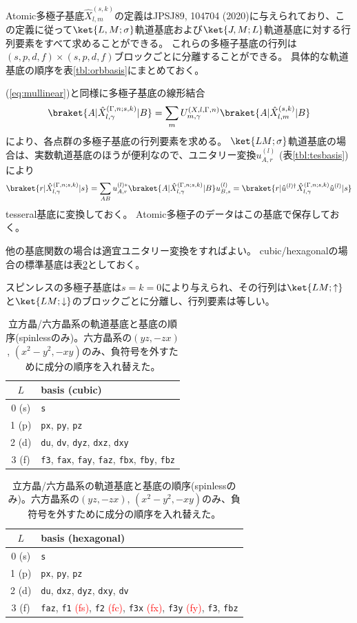 \documentclass[11pt]{easymemo}
\begin{document}
Atomic多極子基底$\hat{X}_{l,m}^{(s,k)}$の定義はJPSJ89, 104704 (2020)に与えられており、この定義に従って$\ket{L,M;\sigma}$軌道基底および$\ket{J,M;L}$軌道基底に対する行列要素をすべて求めることができる。
これらの多極子基底の行列は$(s,p,d,f)\times(s,p,d,f)$ブロックごとに分離することができる。
具体的な軌道基底の順序を表\ref{tbl:orbbasis}にまとめておく。

(\ref{eq:mullinear})と同様に多極子基底の線形結合
\begin{align}
\braket{A|\hat{X}_{l,\gamma}^{(\Gamma,n;s,k)}|B}=\sum_{m}U_{m,\gamma}^{(X,l,\Gamma,n)}\braket{A|\hat{X}_{l,m}^{(s,k)}|B}
\end{align}
により、各点群の多極子基底の行列要素を求める。
$\ket{LM;\sigma}$軌道基底の場合は、実数軌道基底のほうが便利なので、ユニタリー変換$u_{A,r}^{(l)}$ (表\ref{tbl:tesbasis})により
\begin{align}
\braket{r|\hat{X}_{l,\gamma}^{(\Gamma,n;s,k)}|s}
=
\sum_{AB}
u_{A,r}^{(l)*}
\braket{A|\hat{X}_{l,\gamma}^{(\Gamma,n;s,k)}|B}
u_{B,s}^{(l)}
=
\braket{r|\hat{u}^{(l)\dagger}
\hat{X}_{l,\gamma}^{(\Gamma,n;s,k)}
\hat{u}^{(l)}|s}
\end{align}
tesseral基底に変換しておく。
Atomic多極子のデータはこの基底で保存しておく。

他の基底関数の場合は適宜ユニタリー変換をすればよい。
cubic/hexagonalの場合の標準基底は表\ref{tbl:uorb}としておく。


スピンレスの多極子基底は$s=k=0$により与えられ、その行列は$\ket{LM;\uparrow}$と$\ket{LM;\downarrow}$のブロックごとに分離し、行列要素は等しい。

\begin{table}[ht!]
\begin{center}
\small
\caption{立方晶/六方晶系の軌道基底と基底の順序(spinlessのみ)。六方晶系の$(yz,-zx)$, $(x^{2}-y^{2},-xy)$のみ、負符号を外すために成分の順序を入れ替えた。}
\label{tbl:uorb}
\begin{tabular}{cl} \hline\hline
$L$ & basis (cubic) \\ \hline
0 (s) & {\tt s} \\ \hline
1 (p) & {\tt px}, {\tt py}, {\tt pz} \\ \hline
2 (d) & {\tt du}, {\tt dv}, {\tt dyz}, {\tt dxz}, {\tt dxy} \\ \hline
3 (f) & {\tt f3}, {\tt fax}, {\tt fay}, {\tt faz}, {\tt fbx}, {\tt fby}, {\tt fbz} \\
\hline\hline
\end{tabular}
\begin{tabular}{cl} \hline\hline
$L$ & basis (hexagonal) \\ \hline
0 (s) & {\tt s} \\ \hline
1 (p) & {\tt px}, {\tt py}, {\tt pz} \\ \hline
2 (d) & {\tt du}, {\tt dxz}, {\tt dyz}, {\tt dxy}, {\tt dv} \\ \hline
3 (f) & {\tt faz}, {\tt f1} \textcolor{red}{(fs)}, {\tt f2} \textcolor{red}{(fc)}, {\tt f3x} \textcolor{red}{(fx)}, {\tt f3y} \textcolor{red}{(fy)}, {\tt f3}, {\tt fbz} \\
\hline\hline
\end{tabular}
\end{center}
\end{table}
\end{document}
